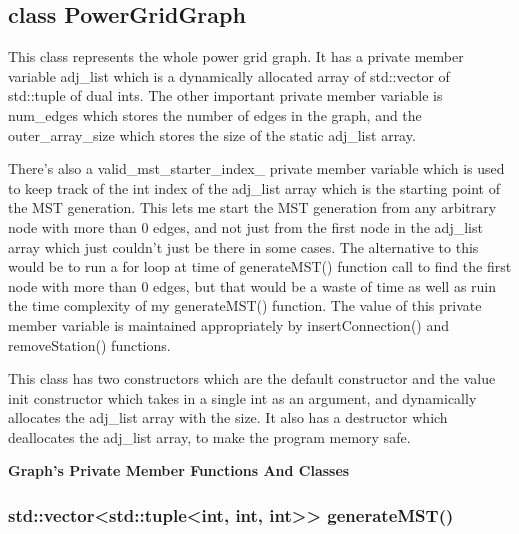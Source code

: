	\subsection{{\color{orange}class} {\Large{\color{draculapurple}PowerGridGraph}}}

		This class represents the whole power grid graph. It has a private member variable {\color{Turquoise}adj\_list} which is a 
		dynamically allocated array of {\color{draculapurple}std::vector} of {\color{draculapurple}std::tuple} of dual {\color{draculapurple}int}s.
		The other important private member variable is {\color{Turquoise}num\_edges} which stores the number of edges in the graph, 
		and the {\color{Turquoise}outer\_array\_size} which stores the size of the static {\color{Turquoise}adj\_list} array.

		There's also a {\color{Turquoise}valid\_mst\_starter\_index\_} private member variable which is used to keep track of the 
		{\color{draculapurple}int} index of the {\color{Turquoise}adj\_list} array which is the starting point of the MST generation.
		This lets me start the MST generation from any arbitrary node with more than 0 edges, and not just from the first node in the 
		{\color{Turquoise}adj\_list} array which just couldn't just be there in some cases. The alternative to this would be to run a for loop at time of 
		{\color{draculapurple}generateMST}() function call to find the first node with more than 0 edges, but that would be a waste of time as well as ruin the time complexity of my 
		{\color{draculapurple}generateMST}() function. The value of this private member variable is maintained appropriately by {\color{draculapurple}insertConnection}() and 
		{\color{draculapurple}removeStation}() functions.

		This class has two constructors which are the default constructor and the value init constructor which takes in a single 
		{\color{draculapurple}int} as an argument, and dynamically allocates the {\color{Turquoise}adj\_list} array with the size.
		It also has a destructor which deallocates the {\color{Turquoise}adj\_list} array, to make the program memory safe.

		\begin{center}
			\noindent\hrulefill\raisebox{-.3\ht\strutbox} { {\textbf{\Large{Graph's Private Member Functions And Classes}}} } \hrulefill\par
		\end{center}

		\subsubsection{{\color{orange} std::vector<std::tuple<int, int, int>> } {\color{draculapurple}generateMST}()}

